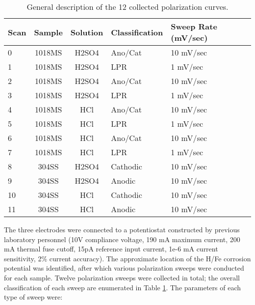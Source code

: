 \begin{table}[h!]
	\centering
	\begin{tabular}{lccp{2.5cm}p{2.5cm}p{6cm}}
	\toprule
	Scan & Sample & Solution & Classification & Sweep Rate (mV/sec) \\
	\midrule
	0 & 1018MS & H2SO4 & Ano/Cat & 10 mV/sec \\
	1 & 1018MS & H2SO4 & LPR & 1 mV/sec \\
	2 & 1018MS & H2SO4 & Ano/Cat & 10 mV/sec  \\
	3 & 1018MS & H2SO4 & LPR & 1 mV/sec  \\
	4 & 1018MS & HCl & Ano/Cat & 10 mV/sec  \\
	5 & 1018MS & HCl & LPR & 1 mV/sec  \\
	6 & 1018MS & HCl & Ano/Cat & 10 mV/sec  \\
	7 & 1018MS & HCl & LPR & 1 mV/sec \\
	8 & 304SS & H2SO4 & Cathodic & 10 mV/sec \\
	9 & 304SS & H2SO4 & Anodic & 10 mV/sec  \\
	10 & 304SS & HCl & Cathodic & 10 mV/sec  \\
	11 & 304SS & HCl & Anodic & 10 mV/sec  \\
	\bottomrule
	\end{tabular}
	\caption{General description of the 12 collected polarization curves.}
	\label{table:sweeps}
\end{table}

The three electrodes were connected to a potentiostat constructed by previous laboratory personnel (10V compliance voltage, 190 mA maximum current, 200 mA thermal fuse cutoff, 15pA reference input current, 1e-6 mA current sensitivity, 2\% current accuracy).\cite{labguide, gsi}  The approximate location of the H/Fe corrosion potential was identified, after which various polarization sweeps were conducted for each sample.  Twelve polarization sweeps were collected in total; the overall classification of each sweep are enumerated in Table \ref{table:sweeps}.  The parameters of each type of sweep were:

